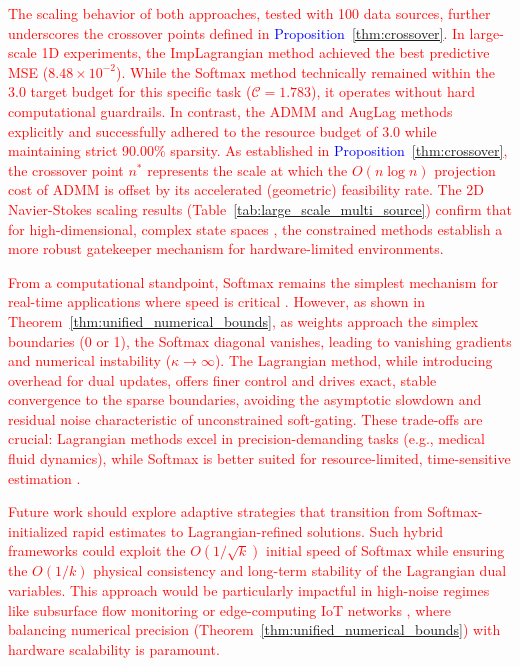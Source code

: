 \documentclass[preprint,12pt,authoryear]{elsarticle}
\begin{document}
\textcolor{red}{The scaling behavior of both approaches, tested with 100 data sources, further underscores the crossover points defined in \textcolor{blue}{Proposition}~\ref{thm:crossover}. In large-scale 1D experiments, the ImpLagrangian method achieved the best predictive MSE ($8.48 \times 10^{-2}$). While the Softmax method technically remained within the 3.0 target budget for this specific task ($\mathcal{C} = 1.783$), it operates without hard computational guardrails. In contrast, the ADMM and AugLag methods explicitly and successfully adhered to the resource budget of 3.0 while maintaining strict 90.00\% sparsity. As established in \textcolor{blue}{Proposition}~\ref{thm:crossover}, the crossover point $n^*$ represents the scale at which the $O(n \log n)$ projection cost of ADMM is offset by its accelerated (geometric) feasibility rate. The 2D Navier-Stokes scaling results (Table~\ref{tab:large_scale_multi_source}) confirm that for high-dimensional, complex state spaces , the constrained methods establish a more robust gatekeeper mechanism for hardware-limited environments.}

\textcolor{red}{From a computational standpoint, Softmax remains the simplest mechanism for real-time applications where speed is critical \cite{asch2016data}. However, as shown in Theorem~\ref{thm:unified_numerical_bounds}, as weights approach the simplex boundaries (0 or 1), the Softmax diagonal vanishes, leading to vanishing gradients and numerical instability ($\kappa \to \infty$). The Lagrangian method, while introducing overhead for dual updates, offers finer control and drives exact, stable convergence to the sparse boundaries, avoiding the asymptotic slowdown and residual noise characteristic of unconstrained soft-gating. These trade-offs are crucial: Lagrangian methods excel in precision-demanding tasks (e.g., medical fluid dynamics), while Softmax is better suited for resource-limited, time-sensitive estimation \cite{reich2023data}.}


\textcolor{red}{Future work should explore adaptive strategies that transition from Softmax-initialized rapid estimates to Lagrangian-refined solutions. Such hybrid frameworks could exploit the $O(1/\sqrt{k})$ initial speed of Softmax while ensuring the $O(1/k)$ physical consistency and long-term stability of the Lagrangian dual variables. This approach would be particularly impactful in high-noise regimes like subsurface flow monitoring or edge-computing IoT networks \cite{carrassi2023data}, where balancing numerical precision (Theorem~\ref{thm:unified_numerical_bounds}) with hardware scalability is paramount.}
\end{document}
